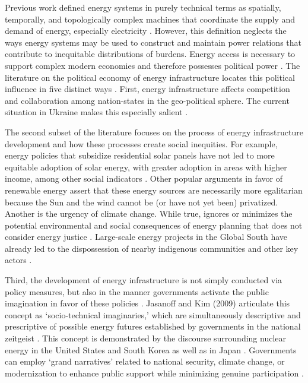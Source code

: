 \noindent\hrulefill

    Previous work defined energy systems in purely technical terms as spatially, temporally, and topologically complex machines that coordinate the supply and demand of energy, especially electricity \cite{dotson_influence_2022}. However, this definition neglects the ways energy systems may be used to construct and maintain power relations that contribute to inequitable distributions of burdens. Energy access is necessary to support complex modern economies and
    therefore possesses political power \cite{jones_building_2013, bridge_energy_2018}. The literature on the political economy of energy infrastructure locates this political influence in five distinct ways \cite{bridge_energy_2018}. First, energy infrastructure affects competition and collaboration among nation-states in the geo-political sphere. The current situation in Ukraine makes this especially salient \cite{figueiredo_impacts_2022}. 
    
    The second subset of the literature focuses on the process of energy infrastructure development
    and how these processes create social inequities. For example, energy policies that subsidize
    residential solar panels have not led to more equitable adoption of solar energy, with greater
    adoption in areas with higher income, among other social indicators \cite{reames_distributional_2020}. Other popular arguments in favor
    of renewable energy assert that these energy sources are necessarily more egalitarian because
    the Sun and the wind cannot be (or have not yet been) privatized. Another is the urgency of climate change. While true, ignores or minimizes the potential environmental and social consequences of energy planning that does not consider energy
    justice \cite{jones_building_2013}. Large-scale energy projects in the Global South have
    already led to the dispossession of nearby indigenous communities and other key actors \cite{yenneti_spatial_2016, barragan-contreras_procedural_2022}.

    Third, the development of energy infrastructure is not simply conducted via policy measures,
    but also in the manner governments activate the public imagination in favor of these policies \cite{bridge_energy_2018,jasanoff_containing_2009}. Jasanoff and Kim (2009) articulate this
    concept as `socio-technical imaginaries,' which are simultaneously descriptive and prescriptive of possible energy futures established by governments in the national zeitgeist \cite{jasanoff_containing_2009}. This concept is demonstrated by the discourse surrounding
    nuclear energy in the United States and South Korea \cite{jasanoff_containing_2009} as well 
    as in Japan \cite{valentine_energy_2019}. Governments can employ `grand narratives' related
    to national security, climate change, or modernization to enhance public support while 
    minimizing genuine participation \cite{bridge_energy_2018}.

